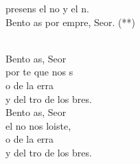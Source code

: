 \documentclass[12pt]{article}
\begin{document}
\begin{multicols*}{2}
\begin{cancion}%
	\begin{chorus}%
	 presens el no y el n.\\
	Bento as por empre, Seor. (**)\\
	\end{chorus}%
	\jump\\
	Bento as, Seor\\
	por te  que nos s\\
	o de la erra\\
	y del tro de los bres.\\
\jump
	Bento as, Seor\\
	el no  nos loiste,\\
	o de la erra\\
	y del tro de los bres.\\
\end{cancion}%


\end{multicols*}
\end{document}
